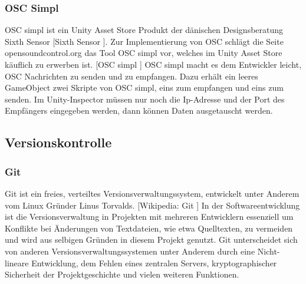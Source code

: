 \documentclass[11pt, titlepage, fleqn]{report}
\begin{document}
                \subsubsection{OSC Simpl}
                OSC simpl ist ein Unity Asset Store Produkt der dänischen 
                Designsberatung Sixth Sensor [Sixth Sensor 
                \cite{sixth-sensor}]. 
                Zur Implementierung von OSC schlägt die Seite 
                opensoundcontrol.org das Tool OSC simpl vor, welches im Unity 
                Asset Store käuflich zu erwerben ist. [OSC simpl 
                \cite{OscSimple}]
                OSC simpl macht es dem Entwickler leicht, OSC Nachrichten zu senden und zu empfangen. Dazu erhält ein leeres GameObject zwei Skripte 
                von OSC simpl, eins zum empfangen und eins zum senden. Im Unity-Inspector müssen nur noch die Ip-Adresse und der Port des 
                Empfängers eingegeben werden, dann können Daten ausgetauscht werden. 
                    
            \subsection{Versionskontrolle}
            \label{sec:2.3.4Kontrolle}
                \subsubsection{Git}
                    Git ist ein freies, verteiltes Versionsverwaltungssystem, 
                    entwickelt unter Anderem vom Linux Gründer Linus Torvalds. 
                    [Wikipedia: Git \cite{Git}]
                    In der Softwareentwicklung ist die Versionsverwaltung in 
                    Projekten mit mehreren Entwicklern essenziell um Konflikte 
                    bei Änderungen 
                    von Textdateien, wie etwa Quelltexten, zu vermeiden und wird aus selbigen Gründen in diesem Projekt genutzt.
                    Git unterscheidet sich von anderen Versionsverwaltungssystemen unter Anderem durch eine Nicht-lineare Entwicklung, dem Fehlen eines 
                    zentralen Servers, kryptographischer Sicherheit der Projektgeschichte und vielen weiteren Funktionen.
\end{document}
